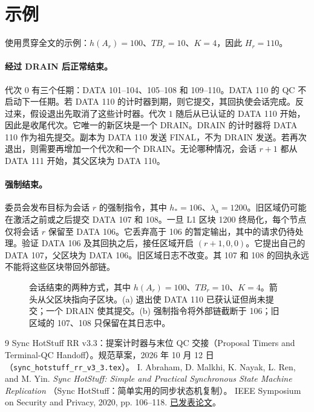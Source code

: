 \documentclass[11pt,a4paper]{article}
\newcommand{\TB}{\mathit{TB}}
\begin{document}
\section{示例}\label{sec:examples}
 使用贯穿全文的示例：$h(A_r)=100$、$\TB_r=10$、$K=4$，因此 $H_r=110$。

\paragraph{经过 DRAIN 后正常结束。}
代次 $0$ 有三个任期：DATA 101--104、105--108 和 109--110。DATA 110 的 QC 不启动下一任期。若 DATA 110 的计时器到期，则它提交，其回执使会话完成。反过来，假设退出先取消了这些计时器。代次 $1$ 随后从已认证的 DATA 110 开始，因此是收尾代次。它唯一的新区块是一个 DRAIN。DRAIN 的计时器将 DATA 110 作为祖先提交。副本为 DATA 110 发送 FINAL，不为 DRAIN 发送。若再次退出，则需要再增加一个代次和一个 DRAIN。无论哪种情况，会话 $r+1$ 都从 DATA 111 开始，其父区块为 DATA 110。

\paragraph{强制结束。}
委员会发布目标为会话 $r$ 的强制指令，其中 $h_*=106$、$\lambda_a=1200$。旧区域仍可能在激活之前或之后提交 DATA 107 和 108。一旦 L1 区块 1200 终局化，每个节点仅将会话 $r$ 保留至 DATA 106。它丢弃高于 106 的暂定输出，其中的请求仍待处理。验证 DATA 106 及其回执之后，接任区域开启 $(r+1,0,0)$。它提出自己的 DATA 107，父区块为 DATA 106。旧区域日志不改变。其 107 和 108 的回执永远不能将这些区块带回外部链。

\begin{figure}[htbp]\centering

\caption{会话结束的两种方式，其中 $h(A_r)=100$、$\TB_r=10$、$K=4$。箭头从父区块指向子区块。(a) 退出使 DATA 110 已获认证但尚未提交；一个 DRAIN 使其提交。(b) 强制指令将外部链截断于 106；旧区域的 107、108 只保留在其日志中。}\label{fig:endings}
\end{figure}

\begingroup\small
\begin{thebibliography}{9}
Sync HotStuff RR v3.3：提案计时器与末位 QC 交接（Proposal Timers and Terminal-QC Handoff）。规范草案，2026 年 10 月 12 日（\texttt{sync\_hotstuff\_rr\_v3\_3.tex}）。
I. Abraham, D. Malkhi, K. Nayak, L. Ren, and M. Yin.
\emph{Sync HotStuff: Simple and Practical Synchronous State Machine Replication}
（Sync HotStuff：简单实用的同步状态机复制）。
IEEE Symposium on Security and Privacy, 2020, pp. 106--118.
\href{https://conferences.computer.org/sp/pdfs/sp/2020/349700a106.pdf}{已发表论文}。
\end{thebibliography}
\endgroup
\end{document}
